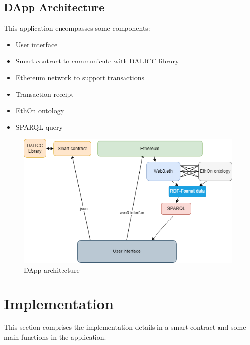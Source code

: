 \subsection{DApp Architecture} 
This application encompasses some components:
\begin{itemize}
	\item User interface
	\item Smart contract to communicate with DALICC library
	\item Ethereum network to support transactions
	\item Transaction receipt
	\item EthOn ontology
	\item SPARQL query    
\end{itemize}
\begin{center}
   \begin{figure}[htb!]
		
		\begin{minipage}{0.75\linewidth}
			
			\includegraphics[width=1.5\textwidth]{images/chap03_eth_dalicc_comm.png}
		\end{minipage}
		\caption{DApp architecture}
	\end{figure}
\end{center}

\section{Implementation}
This section comprises the implementation details in a smart contract and some main functions in the application.

